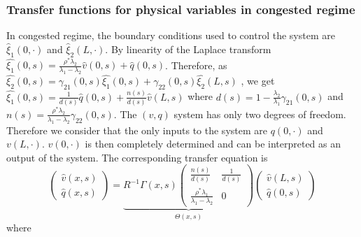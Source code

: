 \documentclass[5p,twocolumn]{elsarticle}
\begin{document}
\subsubsection{Transfer functions for physical variables in congested regime}
In congested regime, the boundary conditions used to control the system are $\hat{\xi}_{1}\left(0,\cdot\right)$ and $\hat{\xi}_{2}\left(L,\cdot\right)$. By linearity of the Laplace transform 
$\hat{\xi_{1}}\left(0,s\right) = 
\frac{
	\rho^{*}\lambda_{2}
}{
	\lambda_{1} - \lambda_{2}
} 
\hat{v}\left(0,s\right)
+
\hat{q}\left(0,s\right)
$.
Therefore, as
$\hat{\xi_{2}}\left(0,s\right) =
\gamma_{21}\left(0,s\right)
\hat{\xi_{1}}\left(0,s\right)
+
\gamma_{22}\left(0,s\right)
\hat{\xi_{2}}\left(L,s\right)$
, we get
$\hat{\xi_{1}}\left(0,s\right) =
\frac{1}{d\left(s\right)}
\hat{q}\left(0,s\right)
+
\frac{n\left(s\right)}{d\left(s\right)}
\hat{v}\left(L,s\right)
$
where
$d\left(s\right) = 1 - \frac{\lambda_{2}}{\lambda_{1}}\gamma_{21}\left(0,s\right)$
and
$n\left(s\right) = \frac{\rho^{*} \lambda_{2}}{\lambda_{1} - \lambda_{2}} \gamma_{22}\left(0,s\right)$. The $\left(v,q\right)$ system has only two degrees of freedom. Therefore we consider that the only inputs to the system are $q\left(0,\cdot\right)$ and $v\left(L,\cdot\right)$. $v\left(0,\cdot\right)$ is then completely determined and can be interpreted as an output of the system. The corresponding transfer equation is
\begin{equation}
\begin{pmatrix}
	\hat{v}\left(x,s\right)
	\\
	\hat{q}\left(x,s\right)
\end{pmatrix}
=
\underset{\Theta\left(x,s\right)}{
\underbrace{
R^{-1}\Gamma\left(x,s\right)
\begin{pmatrix}
	\frac{n\left(s\right)}{d\left(s\right)}
		&
	\frac{1}{d\left(s\right)}	
	\\
	\frac{\rho^{*}\lambda_{1}}{\lambda_{1} - \lambda_{2}}
		&
	0
\end{pmatrix}
}
}
\begin{pmatrix}
	\hat{v}\left(L,s\right)
	\\
	\hat{q}\left(0,s\right)
\end{pmatrix}
\end{equation}
where
\end{document}
